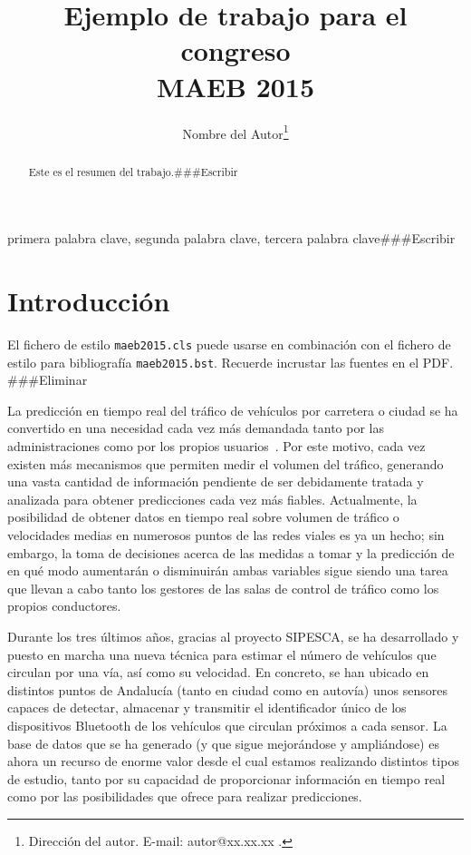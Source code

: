 \documentclass[twocolumn]{maeb2015}
\begin{document}
\title{Ejemplo de trabajo para el congreso \\MAEB 2015} %

\author{Nombre del Autor\thanks{Dirección del autor.
E-mail: autor@xx.xx.xx .}}

\maketitle

\begin{abstract}
Este es el resumen del trabajo.###Escribir
\end{abstract}

\begin{keywords}
primera palabra clave, segunda palabra clave, tercera palabra clave###Escribir
\end{keywords}

\section{Introducción}
El fichero de estilo {\tt maeb2015.cls} puede usarse en combinación con el fichero de estilo para bibliografía {\tt maeb2015.bst}. Recuerde incrustar las fuentes en el PDF. ###Eliminar


La predicción en tiempo real del tráfico de vehículos por carretera o ciudad se ha convertido en una necesidad cada vez más demandada tanto por las administraciones como por los propios usuarios~\cite{Min2011606}. Por este motivo, cada vez existen más mecanismos que permiten medir el volumen del tráfico, generando una vasta cantidad de información pendiente de ser debidamente tratada y analizada para obtener predicciones cada vez más fiables. Actualmente, la posibilidad de obtener datos en tiempo real sobre volumen de tráfico o velocidades medias en numerosos puntos de las redes viales es ya un hecho; sin embargo, la toma de decisiones acerca de las medidas a tomar y la predicción de en qué modo aumentarán o disminuirán ambas variables sigue siendo una tarea que llevan a cabo tanto los gestores de las salas de control de tráfico como los propios conductores.

Durante los tres últimos años, gracias al proyecto SIPESCA, se ha desarrollado y puesto en marcha una nueva técnica para estimar el número de vehículos que circulan por una vía, así como su velocidad. En concreto, se han ubicado en distintos puntos de Andalucía (tanto en ciudad como en autovía) unos sensores capaces de detectar, almacenar y transmitir el identificador único de los dispositivos Bluetooth de los vehículos que circulan próximos a cada sensor. La base de datos que se ha generado (y que sigue mejorándose y ampliándose) es ahora un recurso de enorme valor desde el cual estamos realizando distintos tipos de estudio, tanto por su capacidad de proporcionar información en tiempo real como por las posibilidades que ofrece para realizar predicciones.
\end{document}
